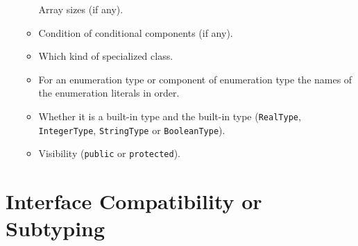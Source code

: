 \begin{itemize}
\begin{itemize}
    Array sizes (if any).
  \item
    Condition of conditional components (if any).
  \item
    Which kind of specialized class.
  \item
    For an enumeration type or component of enumeration type the names
    of the enumeration literals in order.
  \item
    Whether it is a built-in type and the built-in type (\lstinline!RealType!,
    \lstinline!IntegerType!, \lstinline!StringType! or \lstinline!BooleanType!).
  \item
    Visibility (\lstinline!public! or \lstinline!protected!).
  \end{itemize}
\end{itemize}

\section{Interface Compatibility or Subtyping}\label{interface-compatibility-or-subtyping}

